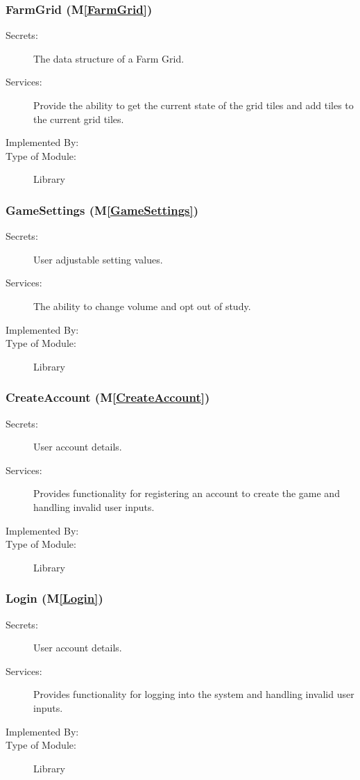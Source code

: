 \documentclass[12pt, titlepage]{article}
\newcommand{\mref}[1]{M\ref{#1}}
\begin{document}
\subsubsection{FarmGrid (\mref{FarmGrid})}

\begin{description}
\item[Secrets:] The data structure of a Farm Grid.
\item[Services:] Provide the ability to get the current state of the grid tiles and add tiles to the current grid tiles.
\item[Implemented By:]  \progname
\item[Type of Module:] Library
\end{description}

\subsubsection{GameSettings (\mref{GameSettings})}

\begin{description}
\item[Secrets:] User adjustable setting values.
\item[Services:] The ability to change volume and opt out of study.
\item[Implemented By:]  \progname
\item[Type of Module:] Library
\end{description}

\subsubsection{CreateAccount (\mref{CreateAccount})}

\begin{description}
\item[Secrets:] User account details.
\item[Services:] Provides functionality for registering an account to create the game and handling invalid user inputs.
\item[Implemented By:]  \progname
\item[Type of Module:] Library
\end{description}

\subsubsection{Login (\mref{Login})}

\begin{description}
\item[Secrets:] User account details.
\item[Services:] Provides functionality for logging into the system and handling invalid user inputs.
\item[Implemented By:]  \progname
\item[Type of Module:] Library
\end{description}
\end{document}
